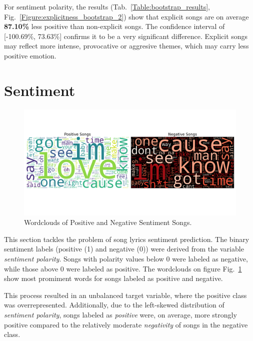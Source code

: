 For sentiment polarity, the results (Tab.~\ref{Table:bootstrap_results},
Fig.~\ref{Figure:explicitness_bootstrap_2}) show that explicit songs are on average
\textbf{87.10\%} less positive than non-explicit songs. The confidence interval
of [-100.69\%, 73.63\%] confirms it to be a very significant difference.
Explicit songs may reflect more intense, provocative or aggresive themes, which
may carry less positive emotion.


\section{Sentiment}
\label{sec:sentiment}
\begin{center}
\begin{figure}[H]
  \centering
  \includegraphics[width=7in]{img/wordclouds.png}
  \caption{Wordclouds of Positive and Negative Sentiment Songs.}
  \label{Figure:wordclouds}
\end{figure}
\end{center}

This section tackles the problem of song lyrics sentiment prediction. The
binary sentiment labels (positive (1) and negative (0)) were derived from the
variable \textit{sentiment polarity}. Songs with polarity values below 0 were
labeled as negative, while those above 0 were labeled as positive. The wordclouds
on figure Fig.~\ref{Figure:wordclouds} show most promiment words for 
songs labeled as positive and negative.


This process resulted in an unbalanced target variable, where the positive
class was overrepresented. Additionally, due to the left-skewed distribution of
\textit{sentiment polarity}, songs labeled as \textit{positive} were, on
average, more strongly positive compared to the relatively moderate
\textit{negativity} of songs in the negative class. 

